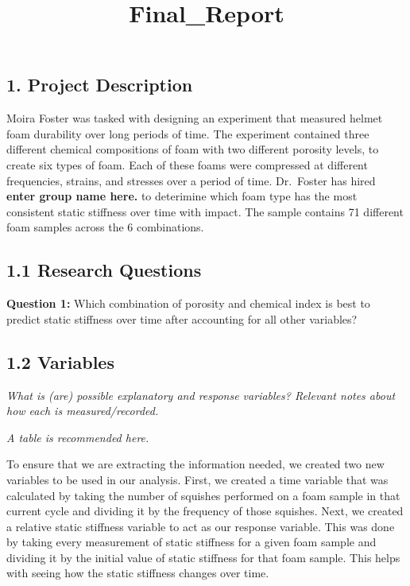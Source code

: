 \documentclass[
  letterpaper,
  DIV=11,
  numbers=noendperiod]{scrartcl}
\title{Final\_Report}
\author{}
\date{}
\begin{document}
\maketitle


\subsection{1. Project Description}\label{project-description}

Moira Foster was tasked with designing an experiment that measured
helmet foam durability over long periods of time. The experiment
contained three different chemical compositions of foam with two
different porosity levels, to create six types of foam. Each of these
foams were compressed at different frequencies, strains, and stresses
over a period of time. Dr.~Foster has hired \textbf{enter group name
here.} to deterimine which foam type has the most consistent static
stiffness over time with impact. The sample contains 71 different foam
samples across the 6 combinations.

\subsection{1.1 Research Questions}\label{research-questions}

\textbf{Question 1:} Which combination of porosity and chemical index is
best to predict static stiffness over time after accounting for all
other variables?

\subsection{1.2 Variables}\label{variables}

\emph{What is (are) possible explanatory and response variables?
Relevant notes about how each is measured/recorded.}

\emph{A table is recommended here.}

To ensure that we are extracting the information needed, we created two
new variables to be used in our analysis. First, we created a time
variable that was calculated by taking the number of squishes performed
on a foam sample in that current cycle and dividing it by the frequency
of those squishes. Next, we created a relative static stiffness variable
to act as our response variable. This was done by taking every
measurement of static stiffness for a given foam sample and dividing it
by the initial value of static stiffness for that foam sample. This
helps with seeing how the static stiffness changes over time.
\end{document}
